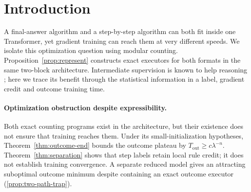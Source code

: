 \begin{abstract}
A two-block Transformer can express both direct and step-by-step modular counting,
yet their supervision formats expose different gradient signals.
Under small initialization with a fixed ReLU pattern, outcome-supervised
cross-entropy flow has an exponentially long plateau at near-chance correct-answer probabilities.
The mechanism is a contraction coefficient $\lambda$: unseen letters hide outcome
credit on the scale $\lambda^n$, whereas displayed states expose a local innovation
controlled by $1-\lambda^2$. A Transformer score expansion connects this data
structure to gradient credit and the outcome plateau. A reduced two-path model
contains both exact executors but also an attracting suboptimal outcome minimum
inside an affine activation regime. Its local basin is proved; convergence from
the tested zero-readout seed remains open. Experiments distinguish prior fitting
from rule learning and test routing and pretrained-model transfer. An object-tracking
reversal identifies a limit of the mechanism. Unrestricted feature and routing
discovery remains open.
\end{abstract}

\section{Introduction}
\label{sec:intro}

A final-answer algorithm and a step-by-step algorithm can both fit inside one Transformer,
yet gradient training can reach them at very different speeds. We isolate this optimization
question using modular counting. Proposition~\ref{prop:represent} constructs exact executors
for both formats in the same two-block architecture. Intermediate supervision is known to
help reasoning \citep{nye2021scratchpads,wei2022cot,lightman2023verify}; here we trace its
benefit through the statistical information in a label, gradient credit and outcome training time.

\paragraph{Optimization obstruction despite expressibility.}
Both exact counting programs exist in the architecture, but their existence does
not ensure that training reaches them. Under its small-initialization hypotheses,
Theorem~\ref{thm:outcome-end} bounds the outcome plateau by
$T_{\mathrm{out}}\ge c\lambda^{-n}$. Theorem~\ref{thm:separation} shows that
step labels retain local rule credit; it does not establish training convergence.
A separate reduced model gives an attracting suboptimal outcome minimum despite
containing an exact outcome executor (\cref{prop:two-path-trap}).

